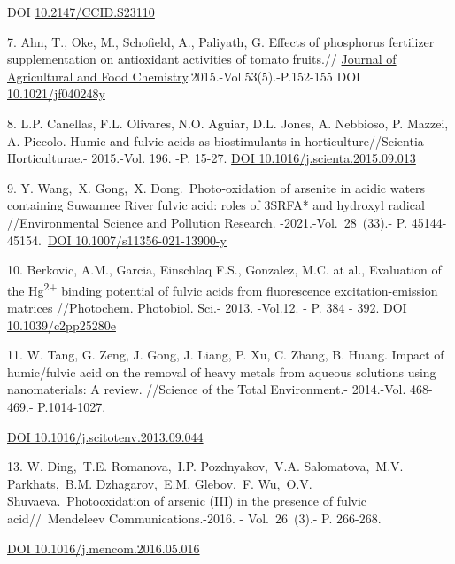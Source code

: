 \begin{references}
DOI \href{https://doi.org/10.2147/ccid.s23110}{10.2147/CCID.S23110}

7. Ahn, T., Oke, M., Schofield, A., Paliyath, G. Effects of phosphorus
fertilizer supplementation on antioxidant activities of tomato fruits.//
\href{https://pubs.acs.org/journal/jafcau?ref=breadcrumb}{Journal of
Agricultural and Food Chemistry}.2015.-Vol.53(5).-P.152-155 DOI
\href{https://doi.org/10.1021/jf040248y}{10.1021/jf040248y}

8. L.P. Canellas, F.L. Olivares, N.O. Aguiar, D.L. Jones, A. Nebbioso,
P. Mazzei, A. Piccolo. Humic and fulvic acids as biostimulants in
horticulture//Scientia Horticulturae.- 2015.-Vol. 196. -P. 15-27.
\href{https://doi.org/10.1016/j.scienta.2015.09.013}{DOI
10.1016/j.scienta.2015.09.013}

9. Y. Wang,~X. Gong,~X. Dong.~Photo-oxidation of arsenite in acidic
waters containing Suwannee River fulvic acid: roles of 3SRFA* and
hydroxyl radical //Environmental Science and Pollution Research.
-2021.-Vol.~28~(33).- P.
45144-45154.~\href{https://doi.org/10.1007/s11356-021-13900-y}{DOI
10.1007/s11356-021-13900-y}

10. Berkovic, A.M., Garcia, Einschlaq F.S., Gonzalez, M.C. at al.,
Evaluation of the Hg\textsuperscript{2+} binding potential of fulvic
acids from fluorescence excitation-emission matrices //Photochem.
Photobiol. Sci.- 2013. -Vol.12. - P. 384 - 392. DOI
\href{https://doi.org/10.1039/c2pp25280e}{10.1039/c2pp25280e}

11. W. Tang, G. Zeng, J. Gong, J. Liang, P. Xu, C. Zhang, B. Huang.
Impact of humic/fulvic acid on the removal of heavy metals from aqueous
solutions using nanomaterials: A review. //Science of the Total
Environment.- 2014.-Vol. 468-469.- P.1014-1027.

\href{https://doi.org/10.1016/j.scitotenv.2013.09.044}{DOI
10.1016/j.scitotenv.2013.09.044}

13. W. Ding,~T.E. Romanova,~I.P. Pozdnyakov,~V.A. Salomatova,~M.V.
Parkhats,~B.M. Dzhagarov,~E.M. Glebov,~F. Wu,~O.V.
Shuvaeva.~Photooxidation of arsenic (III) in the presence of fulvic
acid//~Mendeleev Communications.-2016. - Vol.~26~(3).- P. 266-268.~

\href{https://doi.org/10.1016/j.mencom.2016.05.016}{DOI
10.1016/j.mencom.2016.05.016}
\end{references}

